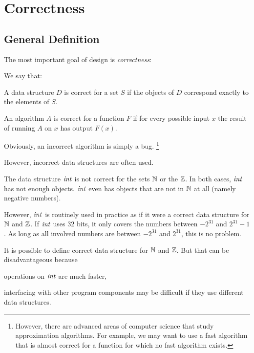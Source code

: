 \section{Correctness}

\subsection{General Definition}

The most important goal of design is \emph{correctness}:

\begin{definition}
We say that:
\begin{compactitem}
 \item A data structure $D$ is correct for a set $S$ if the objects of $D$ correspond exactly to the elements of $S$.
 \item An algorithm $A$ is correct for a function $F$ if for every possible input $x$ the result of running $A$ on $x$ has output $F(x)$.
\end{compactitem}
\end{definition}

Obviously, an incorrect algorithm is simply a bug.%
\footnote{However, there are advanced areas of computer science that study approximation algorithms.
For example, we may want to use a fast algorithm that is almost correct for a function for which no fast algorithm exists.}

However, incorrect data structures are often used.

\begin{example}
The data structure $\mathit{int}$ is not correct for the sets $\mathbb{N}$ or the $\mathbb{Z}$.
In both cases, $\mathit{int}$ has not enough objects.
$\mathit{int}$ even has objects that are not in $\mathbb{N}$ at all (namely negative numbers).

However, $\mathit{int}$ is routinely used in practice as if it were a correct data structure for $\mathbb{N}$ and $\mathbb{Z}$.
If $\mathit{int}$ uses $32$ bits, it only covers the numbers between $-2^{31}$ and $2^{31}-1$.
As long as all involved numbers are between $-2^{31}$ and $2^{31}$, this is no problem.

It is possible to define correct data structure for $\mathbb{N}$ and $\mathbb{Z}$.
But that can be disadvantageous because
\begin{compactitem}
\item operations on $\mathit{int}$ are much faster,
\item interfacing with other program components may be difficult if they use different data structures.
\end{compactitem}
\end{example}

